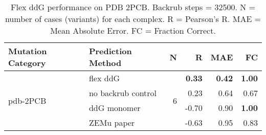 \begin{table}
  \begin{tabular}{llrrrr}
\toprule
Mutation Category &   Prediction Method &  N &     R &  MAE &   FC \\
\midrule
 \multirow{ 4}{*}{pdb-2PCB} & flex ddG & \multirow{ 4}{*}{6} & \textbf{0.33} & \textbf{0.42} & \textbf{1.00}  \\
 & no backrub control & & 0.23 & 0.64 & 0.67  \\
 & ddG monomer & & -0.70 & 0.90 & \textbf{1.00}  \\
 & ZEMu paper & & -0.63 & 0.95 & 0.83  \\
\bottomrule
\end{tabular}
  \caption[Flex ddG performance on PDB 2PCB]{
    Flex ddG performance on PDB 2PCB. Backrub steps = 32500. N = number of cases (variants) for each complex. R = Pearson's R. MAE = Mean Absolute Error. FC = Fraction Correct.
  } \label{tab:table-pdb-2PCB}
\end{table}
